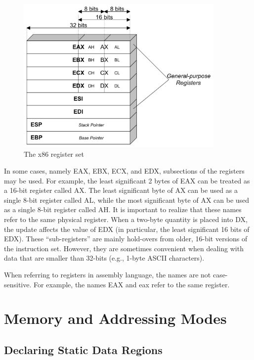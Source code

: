 \begin{figure}[h]
\begin{center}
\includegraphics[width=4in]{x86/x86-register-diagram.pdf}
\end{center}
\caption{The x86 register set}
\label{x86-register-diagram.fig}
\end{figure}

In some cases, namely EAX, EBX, ECX, and EDX, subsections of the
registers may be used.  For example, the least significant 2 bytes of
EAX can be treated as a 16-bit register called AX.  The least
significant byte of AX can be used as a single 8-bit register called
AL, while the most significant byte of AX can be used as a single
8-bit register called AH. It is important to realize that these names
refer to the same physical register. When a two-byte quantity is
placed into DX, the update affects the value of EDX (in particular,
the least significant 16 bits of EDX). These ``sub-registers''
are mainly hold-overs from older, 16-bit versions of the instruction
set. However, they are sometimes convenient when dealing with data
that are smaller than 32-bits (e.g., 1-byte ASCII characters).

When referring to registers in assembly language, the names are not
case-sensitive. For example, the names EAX and eax refer to the same
register.

\section{Memory and Addressing Modes}

\subsection{Declaring Static Data Regions}

